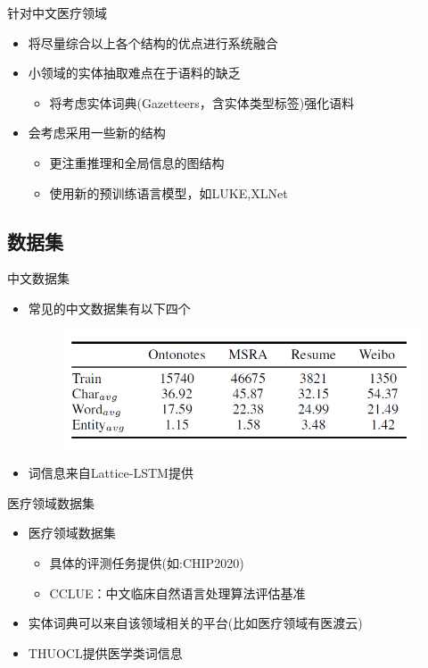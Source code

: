 \documentclass[notheorems, aspectratio=54, compress]{beamer}
\begin{document}
\begin{frame}{针对中文医疗领域}
  \begin{itemize}
  	\item 将尽量综合以上各个结构的优点进行系统融合
    \item 小领域的实体抽取难点在于语料的缺乏
    \begin{itemize}
      \item 将考虑实体词典(Gazetteers，含实体类型标签)强化语料
    \end{itemize}
    \item 会考虑采用一些新的结构
    \begin{itemize}
    	\item 更注重推理和全局信息的图结构
    	\item 使用新的预训练语言模型，如LUKE\cite{yamada2020luke},XLNet\cite{yang2019xlnet}
    \end{itemize}
  \end{itemize}
\end{frame}

\subsection{数据集}

\begin{frame}{中文数据集}
  \begin{itemize}
  	\item 常见的中文数据集有以下四个
    \begin{figure}
    	\centering
    	\includegraphics[width=0.8\linewidth,height=0.6\textheight,keepaspectratio]{dataset}
    \end{figure}
	\item 词信息来自Lattice-LSTM\cite{zhang2018chinese}提供
  \end{itemize}
\end{frame}

\begin{frame}{医疗领域数据集}
	\begin{itemize}
		\item 医疗领域数据集
		\begin{itemize}
			\item 具体的评测任务提供(如:CHIP2020)
			\item CCLUE：中文临床自然语言处理算法评估基准
		\end{itemize}
		\item 实体词典可以来自该领域相关的平台(比如医疗领域有医渡云)
		\item THUOCL提供医学类词信息
	\end{itemize}
\end{frame}
\end{document}
